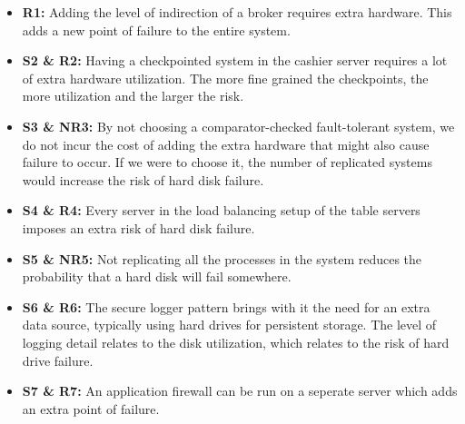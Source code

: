 \documentclass[a4paper,11pt]{report}
\begin{document}
\begin{itemize}
\item \textbf{R1:} Adding the level of indirection of a broker requires extra hardware. This adds a new point of failure to the entire system.
\item \textbf{S2 \& R2:} Having a checkpointed system in the cashier server requires a lot of extra hardware utilization. The more fine grained the checkpoints, the more utilization and the larger the risk.
\item \textbf{S3 \& NR3:} By not choosing a comparator-checked fault-tolerant system, we do not incur the cost of adding the extra hardware that might also cause failure to occur. If we were to choose it, the number of replicated systems would increase the risk of hard disk failure.
\item \textbf{S4 \& R4:} Every server in the load balancing setup of the table servers imposes an extra risk of hard disk failure.
\item \textbf{S5 \& NR5:} Not replicating all the processes in the system reduces the probability that a hard disk will fail somewhere.
\item \textbf{S6 \& R6:} The secure logger pattern brings with it the need for an extra data source, typically using hard drives for persistent storage. The level of logging detail relates to the disk utilization, which relates to the risk of hard drive failure.
\item \textbf{S7 \& R7:} An application firewall can be run on a seperate server which adds an extra point of failure.
\end{itemize}
\end{document}
